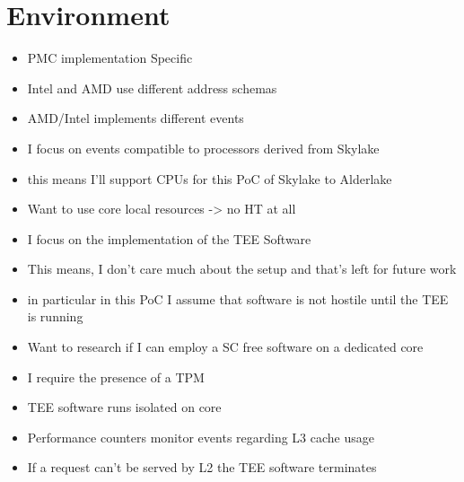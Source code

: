 \section{Environment}
\begin{itemize}
      \item PMC implementation Specific
      \item Intel and AMD use different address schemas
      \item AMD/Intel implements different events
      \item I focus on events compatible to processors derived from Skylake
      \item this means I'll support CPUs for this PoC of Skylake to Alderlake
      \item Want to use core local resources -> no HT at all
      \item I focus on the implementation of the TEE Software
      \item This means, I don't care much about the setup and that's left for
            future work
      \item in particular in this PoC I assume that software is not hostile until
            the TEE is running
      \item Want to research if I can employ a SC free software on a dedicated core
      \item I require the presence of a TPM
      \item TEE software runs isolated on core
      \item Performance counters monitor events regarding L3 cache usage
      \item If a request can't be served by L2 the TEE software terminates
\end{itemize}

